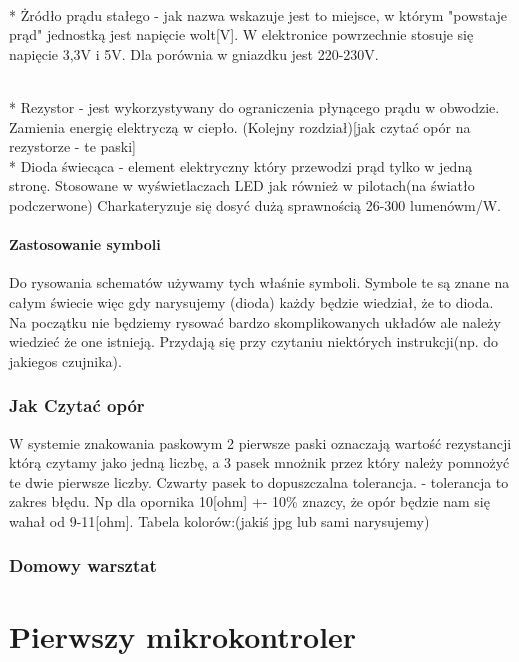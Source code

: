 \\* Żródło prądu stałego - jak nazwa wskazuje jest to miejsce, w którym "powstaje prąd" jednostką jest napięcie wolt[V]. W elektronice powrzechnie stosuje się napięcie 3,3V i 5V. Dla porównia w gniazdku jest 220-230V.

\\* Rezystor - jest wykorzystywany do ograniczenia płynącego prądu w obwodzie. Zamienia energię elektryczą w ciepło. (Kolejny rozdział)[jak czytać opór na rezystorze - te paski]
\\* Dioda świecąca - element elektryczny który przewodzi prąd tylko w jedną stronę. Stosowane w wyświetlaczach LED jak również w pilotach(na światło podczerwone) Charkateryzuje się dosyć dużą sprawnością 26-300 lumenówm/W. 

\subsubsection{Zastosowanie symboli}
    
Do rysowania schematów używamy tych właśnie symboli. Symbole te są znane na całym świecie więc gdy narysujemy (dioda) każdy będzie wiedział, że to dioda. Na początku nie będziemy rysować bardzo skomplikowanych układów ale należy wiedzieć że one istnieją. Przydają się przy czytaniu niektórych instrukcji(np. do jakiegos czujnika).

	\subsection{Jak Czytać opór}
	W systemie znakowania paskowym 2 pierwsze paski oznaczają wartość rezystancji którą czytamy jako jedną liczbę, a 3 pasek mnożnik przez który należy pomnożyć te dwie pierwsze liczby.
Czwarty pasek to dopuszczalna tolerancja. - tolerancja to zakres błędu. Np dla opornika 10[ohm] +- 10\% znazcy, że opór będzie nam się wahał od 9-11[ohm].
Tabela kolorów:(jakiś jpg lub sami narysujemy)

	\subsection {Domowy warsztat}
    
%        
        
\newpage
\chapter{Pierwszy mikrokontroler}
